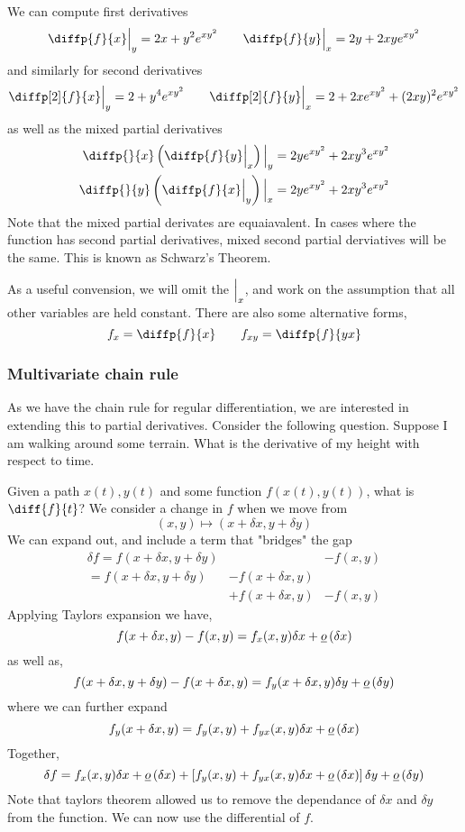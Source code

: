 \documentclass{article}
\begin{document}
\begin{eg}[$f(x) = x^2 + y^2 + e^{xy^2}$]
    We can compute first derivatives
    \[
        \diffp{f}{x} \Big{|}_{y} = 2x + y^2e^{xy^2} \qquad \diffp{f}{y} \Big{|}_{x} = 2y + 2xye^{xy^2}
    \]
    and similarly for second derivatives
    \[
        \diffp[2]{f}{x} \Big{|}_{y} = 2 + y^4e^{xy^2} \qquad \diffp[2]{f}{y} \Big{|}_{x} = 2 + 2xe^{xy^2} + (2xy)^2e^{xy^2}
    \]
    as well as the mixed partial derivatives
    \begin{align*}
        \diffp{}{x}\bkt{\diffp{f}{y} \Big{|}_{x}} \Big{|}_{y} &= 2ye^{xy^2} + 2xy^3e^{xy^2} \\
        \diffp{}{y}\bkt{\diffp{f}{x} \Big{|}_{y}} \Big{|}_{x} &= 2ye^{xy^2} + 2xy^3e^{xy^2} \\
    \end{align*}
    Note that the mixed partial derivates are equaiavalent. In cases where the function has second partial derivatives, mixed second partial derviatives will be the same. This is known as Schwarz's Theorem.
\end{eg}

\begin{notation}
    As a useful convension, we will omit the $\Big{|}_{x}$, and work on the assumption that all other variables are held constant. There are also some alternative forms,
    \[
        f_x = \diffp{f}{x} \qquad f_{xy} = \diffp{f}{{y}{x}}  
    \]
\end{notation}
\subsubsection{Multivariate chain rule}
As we have the chain rule for regular differentiation, we are interested in extending this to partial derivatives. Consider the following question. Suppose I am walking around some terrain. What is the derivative of my height with respect to time.

Given a path $x(t), y(t)$ and some function $f(x(t), y(t))$, what is $\diff{f}{t}$? We consider a change in $f$ when we move from 
\[
    (x, y) \mapsto (x + \delta x, y + \delta y)    
\]
We can expand out, and include a term that "bridges" the gap
\begin{align*}
    \delta f = f(x + \delta x, y + \delta y) & &- f(x, y) \\
    = f(x + \delta x, y + \delta y) &- f(x + \delta x, y) \\
    &+f(x + \delta x, y) &- f(x, y)
\end{align*}
Applying Taylors expansion we have,
\[
    f(x + \delta x, y) - f(x, y) = f_x(x, y)\delta x + \underline{o}\left( \delta x \right)
\]
as well as,
\[
    f(x + \delta x, y + \delta y) - f(x + \delta x, y) = f_y(x + \delta x, y)\delta y + \underline{o}\left( \delta y \right)
\]
where we can further expand
\[
    f_y(x + \delta x, y) = f_y(x, y) + f_{yx}(x, y)\delta x + \underline{o}\left( \delta x \right)
\]
Together,
\[
    \delta f = f_x(x, y)\delta x + \underline{o}\left( \delta x \right) + \left[ f_y(x, y) + f_{yx}(x, y)\delta x + \underline{o}\left( \delta x \right) \right]\delta y + \underline{o}\left( \delta y \right)
\]
Note that taylors theorem allowed us to remove the dependance of $\delta x$ and $\delta y$ from the function. We can now use the differential of $f$.
\end{document}
